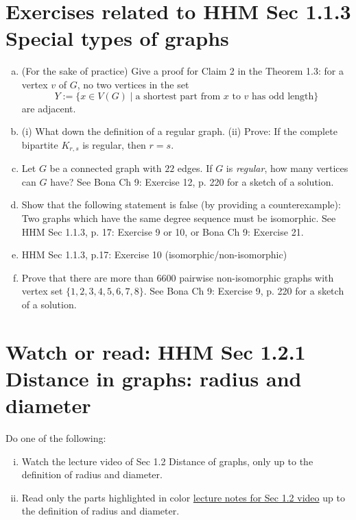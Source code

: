 \documentclass[11pt]{amsart}
\begin{document}
\section{Exercises related to HHM Sec 1.1.3 Special types of graphs}


\begin{enumerate}[a.]
\item 
(For the sake of practice)
Give a proof for Claim 2 in the Theorem 1.3: for a vertex $v$ of $G$, no two vertices in the set 
\[
Y:=\{ x \in V(G) \mid \text{a shortest part from } x \text{ to } v \text{ has odd length}\}
\]
 are adjacent. 


\item 
(i) What down the definition of a regular graph. 
(ii) Prove: 
If the complete bipartite $K_{r,s}$ is regular, then $r=s$.

\item
Let $G$ be a connected graph with $22$ edges. If $G$ is \emph{regular}, how many vertices can $G$ have? 
See Bona Ch 9: Exercise 12, p. 220 for a sketch of a solution.





\item
Show that the following statement is false (by providing a counterexample): Two graphs which have the same degree sequence must be isomorphic. See HHM Sec 1.1.3, p. 17: Exercise 9 or 10, or Bona Ch 9: Exercise 21.



\item 
HHM Sec 1.1.3, p.17: Exercise 10
(isomorphic/non-isomorphic)

\item 
Prove that there are more than $6600$ pairwise non-isomorphic graphs with vertex set $\{ 1,2,3,4,5,6,7,8\}$.
See Bona Ch 9: Exercise 9, p. 220 for a sketch of a solution.




\end{enumerate}




\section{Watch or read: HHM Sec 1.2.1  Distance in graphs: radius and diameter}

Do one of the following:
\begin{enumerate}[i.]
	\item Watch the lecture video of Sec 1.2 Distance of graphs, only up to the definition of radius and diameter. 
	\item Read only the parts highlighted in color  \href{https://egunawan.github.io/combinatorics/notes/notes1_2distance_in_graphs.pdf}{lecture notes for Sec 1.2 video} up to the definition of radius and diameter.
\end{enumerate}
\end{document}
